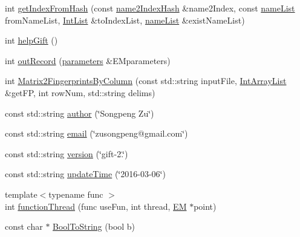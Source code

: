 \begin{DoxyCompactItemize}
\item 
int \hyperlink{namespacegift_a835110af070bdfb37d092c6a7f79d65c}{get\+Index\+From\+Hash} (const \hyperlink{namespacegift_a88a96011620ed18b8321bc36a816773c}{name2\+Index\+Hash} \&name2\+Index, const \hyperlink{namespacegift_a62f85efaab3bff48335863ae0670c7a7}{name\+List} from\+Name\+List, \hyperlink{namespacegift_a786390fe70b2e3b6d61dba1014651f03}{Int\+List} \&to\+Index\+List, \hyperlink{namespacegift_a62f85efaab3bff48335863ae0670c7a7}{name\+List} \&exist\+Name\+List)
\item 
int \hyperlink{namespacegift_abe7a96fe61b2734ca7a9e17ba2f887ae}{help\+Gift} ()
\item 
int \hyperlink{namespacegift_ac979b293ba5cbc8e11abe5cb82c2aede}{out\+Record} (\hyperlink{classgift_1_1parameters}{parameters} \&E\+Mparameters)
\item 
int \hyperlink{namespacegift_ab77c5b0e239f05c8453cc623b856692f}{Matrix2\+Fingerprints\+By\+Column} (const std\+::string input\+File, \hyperlink{namespacegift_a98b589c33d80e413fceaf8afd8e25815}{Int\+Array\+List} \&get\+FP, int row\+Num, std\+::string delims)
\item 
const std\+::string \hyperlink{namespacegift_a808b6e0e19d275854aa787f2eac4df98}{author} (\char`\"{}Songpeng Zu\char`\"{})
\item 
const std\+::string \hyperlink{namespacegift_aa24ca2be91b60d3c50d6848e87233a4c}{email} (\char`\"{}zusongpeng@gmail.\+com\char`\"{})
\item 
const std\+::string \hyperlink{namespacegift_a5a720324a7e112ad94437108be453df3}{version} (\char`\"{}gift-\/2.\char`\"{})
\item 
const std\+::string \hyperlink{namespacegift_a5de68828ba8a73f6e0de9f39d06aaa66}{update\+Time} (\char`\"{}2016-\/03-\/06\char`\"{})
\item 
{\footnotesize template$<$typename func $>$ }\\int \hyperlink{namespacegift_a0ba808abf8dcd67f2ca7cdff2a9fb91c}{function\+Thread} (func use\+Fun, int thread, \hyperlink{classgift_1_1_e_m}{EM} $\ast$point)
\item 
const char $\ast$ \hyperlink{namespacegift_a2dcec74ec4b5ef21616982a060e13f5e}{Bool\+To\+String} (bool b)
\end{DoxyCompactItemize}
